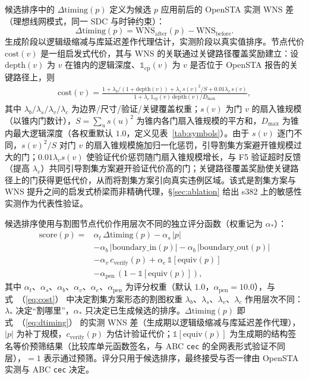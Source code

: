 \documentclass[journal]{IEEEtran}
\renewcommand{\eqref}[1]{\textup{（\ref{#1}）}}
\begin{document}
候选排序中的 $\Delta\mathrm{timing}(p)$ 定义为候选 $p$ 应用前后的 OpenSTA 实测 WNS 差（理想线网模式，同一 SDC 与时钟约束）：
\begin{equation}\label{eq:dtiming}
\Delta\mathrm{timing}(p) = \mathrm{WNS}_{\mathrm{after}}(p) - \mathrm{WNS}_{\mathrm{before}}.
\end{equation}
生成阶段以逻辑级缩减与库延迟差作代理估计，实测阶段以真实值排序。节点代价 $\mathrm{cost}(v)$ 是一组启发式代价，其与 WNS 的关联通过关键路径覆盖奖励建立：设 $\mathrm{depth}(v)$ 为 $v$ 在锥内的逻辑深度、$\mathbb{1}_{\mathrm{cp}}(v)$ 为 $v$ 是否位于 OpenSTA 报告的关键路径上，则
{\small
\begin{equation}
\label{eq:cost}
\begin{split}
\mathrm{cost}(v) = \frac{1 + \lambda_b/(1+\mathrm{depth}(v)) + \lambda_s\,s(v)^2/S + 0.01\lambda_v\,s(v)}{1 + \lambda_c\,\mathbb{1}_{\mathrm{cp}}(v)\,\mathrm{depth}(v)/D_{\max}},
\end{split}
\end{equation}
}
其中 $\lambda_b/\lambda_s/\lambda_v/\lambda_c$ 为边界/尺寸/验证/关键覆盖权重；$s(v)$ 为门 $v$ 的扇入锥规模（以锥内门数计），$S=\sum_u s(u)^2$ 为锥内各门扇入锥规模的平方和，$D_{\max}$ 为锥内最大逻辑深度（各权重默认 $1.0$，定义见表~\ref{tab:symbols}）。由于 $s(v)$ 逐门不同，$s(v)^2/S$ 对门 $v$ 的扇入锥规模施加归一化惩罚，引导割集方案避开锥规模过大的门；$0.01\lambda_v s(v)$ 使验证代价惩罚随门扇入锥规模增长，与 F5 验证超时反馈（提高 $\lambda_v$）共同引导割集方案避开验证代价高的门；关键路径覆盖奖励使关键路径上的门获得更低代价，从而将割集方案引向真实违例区域。该式是割集方案与 WNS 提升之间的启发式桥梁而非精确代理，\S\ref{sec:ablation} 给出 s382 上的敏感性实测作为代表性验证。

候选排序使用与割图节点代价作用层次不同的独立评分函数（权重记为 $\alpha_*$）：
{\small
\begin{equation}\label{eq:score}
\begin{split}
\mathrm{score}(p) = {}&\alpha_t\,\Delta\mathrm{timing}(p) - \alpha_s\,|p| \\
&- \alpha_b\,|\mathrm{boundary\_in}(p)| - \alpha_b\,|\mathrm{boundary\_out}(p)| \\
&- \alpha_v\,c_{\mathrm{verify}}(p) + \alpha_e\,\mathbb{1}[\mathrm{equiv}(p)] \\
&- \alpha_{\mathrm{pen}}\,(1-\mathbb{1}[\mathrm{equiv}(p)]),
\end{split}
\end{equation}
}
其中 $\alpha_t$、$\alpha_s$、$\alpha_b$、$\alpha_v$、$\alpha_e$、$\alpha_{\mathrm{pen}}$ 为评分权重（默认 $1.0$，$\alpha_{\mathrm{pen}}=10.0$），与式~\eqref{eq:cost} 中决定割集方案形态的割图权重 $\lambda_b$、$\lambda_s$、$\lambda_v$、$\lambda_c$ 作用层次不同：$\lambda_*$ 决定“割哪里”，$\alpha_*$ 只决定已生成候选的排序。$\Delta\mathrm{timing}(p)$ 即式~\eqref{eq:dtiming} 的实测 WNS 差（生成期以逻辑级缩减与库延迟差作代理），$|p|$ 为补丁规模，$c_{\mathrm{verify}}(p)$ 为估计验证代价；$\mathbb{1}[\mathrm{equiv}(p)]$ 为生成期的结构签名等价预筛结果（比较库单元函数签名，与 ABC \texttt{cec} 的全网表形式验证不同层），$=1$ 表示通过预筛。评分只用于候选排序，最终接受与否一律由 OpenSTA 实测与 ABC \texttt{cec} 决定。
\end{document}
